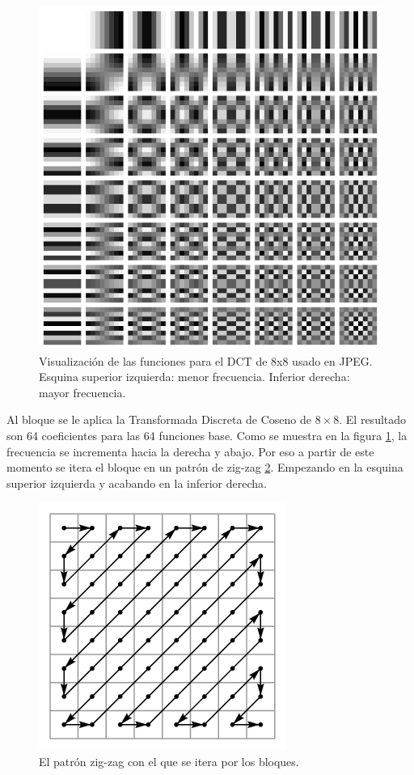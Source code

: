 \begin{figure}[h]
    \includegraphics{DCT-8x8}
    \caption{Visualización de las funciones para el DCT de 8x8 usado en JPEG.
    Esquina superior izquierda: menor frecuencia. Inferior derecha: mayor
frecuencia.}
    \label{fig:dct}
\end{figure}



Al bloque se le aplica la Transformada Discreta de Coseno de $8\times8$. El
resultado son 64 coeficientes para las 64 funciones base. Como se muestra en la
figura \ref{fig:dct}, la frecuencia se incrementa hacia la derecha y abajo. Por
eso a partir de este momento se itera el bloque en un patrón de zig-zag
\ref{fig:zigzag}. Empezando en la esquina superior izquierda y acabando en la
inferior derecha.

\begin{figure}[h]
    \includegraphics{zigzag}
    \caption{El patrón zig-zag con el que se itera por los bloques.}
    \label{fig:zigzag}
\end{figure}

